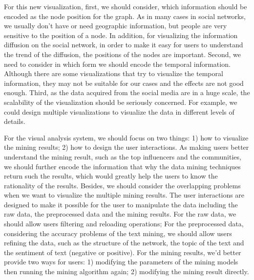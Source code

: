For this new visualization, first, we should consider, which information should be encoded as the node position for the graph. As in many cases in social networks, we usually don't have or need geographic information, but people are very sensitive to the position of a node. In addition, for visualizing the information diffusion on the social network, in order to make it easy for users to understand the trend of the diffusion, the positions of the nodes are important. Second, we need to consider in which form we should encode the temporal information. Although there are some visualizations that try to visualize the temporal information, they may not be suitable for our cases and the effects are not good enough. Third, as the data acquired from the social media are in a huge scale, the scalability of the visualization should be seriously concerned. For example, we could design multiple visualizations to visualize the data in different levels of details. 


For the visual analysis system, we should focus on two things: 1) how to visualize the mining results; 2) how to design the user interactions. As making users better understand the mining result, such as the top influencers and the communities, we should further encode the information that why the data mining techniques return such the results, which would greatly help the users to know the rationality of the results. Besides, we should consider the overlapping problems when we want to visualize the multiple mining results. The user interactions are designed to make it possible for the user to manipulate the data including the raw data, the preprocessed data and the mining results. For the raw data, we should allow users filtering and reloading operations; For the preprocessed data, considering the accuracy problems of the text mining, we should allow users refining the data, such as the structure of the network, the topic of the text and the sentiment of text (negative or positive). For the mining results, we'd better provide two ways for users: 1) modifying the parameters of the mining models then running the mining algorithm again; 2) modifying the mining result directly. 








